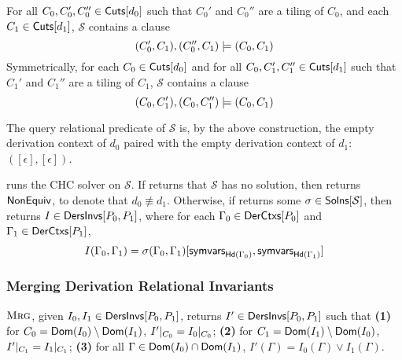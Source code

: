 For all $C_0, C_0', C_0'' \in \mathsf{Cuts}[ d_0 ]$ such that $C_0'$ and $C_0''$
are a tiling of $C_0$, and %
each $C_1 \in \mathsf{Cuts}[ d_1 ]$, $\mathcal{S}$ contains a clause
\[ (C_0', C_1), (C_0'', C_1) \models (C_0, C_1) \]
%
Symmetrically, for each $C_0 \in \mathsf{Cuts}[ d_0 ]$ and %
for all $C_0, C_1', C_1'' \in \mathsf{Cuts}[ d_1 ]$ such that $C_1'$ and $C_1''$
are a tiling of $C_1$, %
$\mathcal{S}$ contains a clause
\[ (C_0, C_1'), (C_0, C_1'') \models (C_0, C_1)
\]

The query relational predicate of $\mathcal{S}$ is, by the above
construction, the empty derivation context of $d_0$ paired with the
empty derivation context of $d_1$: $( [ \epsilon ], [ \epsilon ])$.

\verifyders runs the CHC solver \solvechc on $\mathcal{S}$.
%
If \solvechc returns that $\mathcal{S}$ has no solution, then
\verifyders returns $\mathsf{NonEquiv}$, to denote that $d_0 \not\equiv d_1$.
%
Otherwise, if \solvechc returns some $\sigma \in \mathsf{Solns}[ 
  \mathcal{S}  ]$, then \verifyders returns $I \in
\mathsf{DersInvs}[ P_0, P_1 ]$, where for each $\Gamma_0 \in \mathsf{DerCtxs}[  P_0  ]$
and $\Gamma_1 \in \mathsf{DerCtxs}[  P_1  ]$,
\[ I(\Gamma_0, \Gamma_1) = %
\subs{ \sigma(\Gamma_0, \Gamma_1) }{ %
  \symvars{ \headexps( \Gamma_0 ) }, %
  \symvars{ \headexps( \Gamma_1 ) } } \]

\subsubsection{Merging Derivation Relational Invariants}
\label{sec:merge}
$\textsc{Mrg}$, given $I_0, I_1 \in \mathsf{DersInvs}[ P_0, P_1 ]$, returns $I'
\in \mathsf{DersInvs}[ P_0, P_1 ]$ such that
\textbf{(1)} for $C_0 = \mathsf{Dom}(I_0) \setminus \mathsf{Dom}(I_1)$,
$I'|_{C_0} = I_0|_{C_0}$; 
\textbf{(2)} for $C_1 = \mathsf{Dom}(I_1) \setminus \mathsf{Dom}(I_0)$,
$I'|_{C_1} = I_1|_{C_1}$;
\textbf{(3)} for all $\Gamma \in \mathsf{Dom}(I_0) \cap
\mathsf{Dom}(I_1)$, $I'(\Gamma) = I_0(\Gamma) \lor I_1(\Gamma)$.

